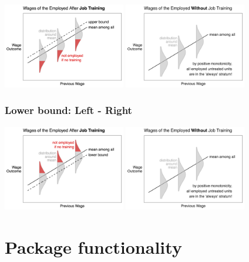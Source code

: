 \documentclass[
]{book}
\begin{document}
\includegraphics[width=0.4\textwidth,height=\textheight]{assets/teach_jobtrain_upper.png}
\includegraphics[width=0.4\textwidth,height=\textheight]{assets/teach_jobtrain_control.png}

\hypertarget{lower-bound-left---right}{%
\subsection{Lower bound: Left - Right}\label{lower-bound-left---right}}

\includegraphics[width=0.4\textwidth,height=\textheight]{assets/teach_jobtrain_lower.png}
\includegraphics[width=0.4\textwidth,height=\textheight]{assets/teach_jobtrain_control.png}

\hypertarget{package-functionality}{%
\chapter{Package functionality}\label{package-functionality}}
\end{document}
